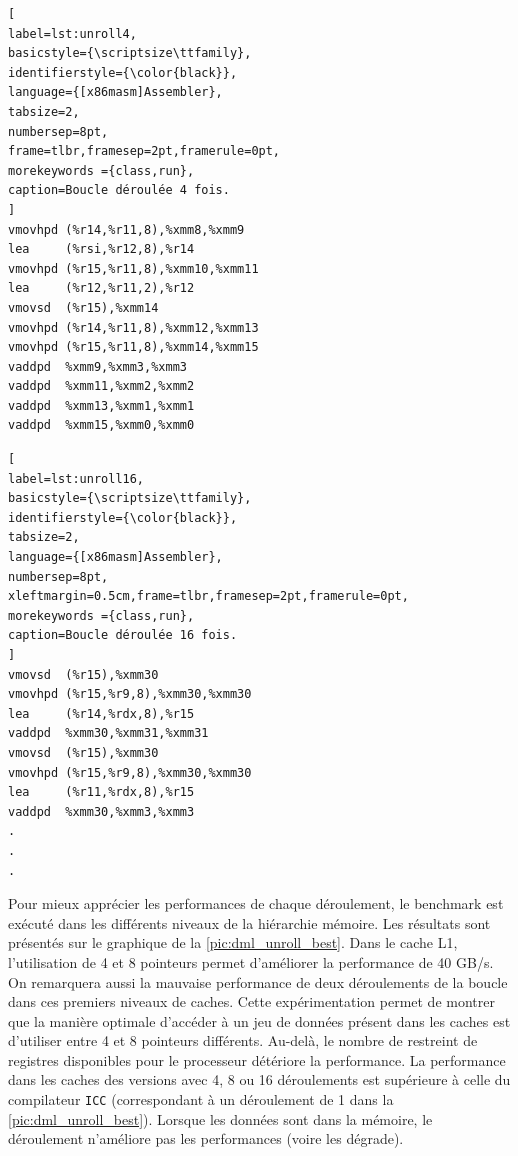 \begin{minipage}{.45\textwidth}
\begin{lstlisting}[
label=lst:unroll4,
basicstyle={\scriptsize\ttfamily},
identifierstyle={\color{black}},
language={[x86masm]Assembler},
tabsize=2,
numbersep=8pt,
frame=tlbr,framesep=2pt,framerule=0pt,
morekeywords ={class,run},
caption=Boucle déroulée 4 fois.
]
vmovhpd (%r14,%r11,8),%xmm8,%xmm9
lea     (%rsi,%r12,8),%r14
vmovhpd (%r15,%r11,8),%xmm10,%xmm11
lea     (%r12,%r11,2),%r12
vmovsd  (%r15),%xmm14
vmovhpd (%r14,%r11,8),%xmm12,%xmm13
vmovhpd (%r15,%r11,8),%xmm14,%xmm15
vaddpd  %xmm9,%xmm3,%xmm3
vaddpd  %xmm11,%xmm2,%xmm2
vaddpd  %xmm13,%xmm1,%xmm1
vaddpd  %xmm15,%xmm0,%xmm0
\end{lstlisting}
\end{minipage}%
\hfill
%
\begin{minipage}{.45\textwidth}
\begin{lstlisting}[
label=lst:unroll16,
basicstyle={\scriptsize\ttfamily},
identifierstyle={\color{black}},
tabsize=2,
language={[x86masm]Assembler},
numbersep=8pt,
xleftmargin=0.5cm,frame=tlbr,framesep=2pt,framerule=0pt,
morekeywords ={class,run},
caption=Boucle déroulée 16 fois.
]
vmovsd  (%r15),%xmm30
vmovhpd (%r15,%r9,8),%xmm30,%xmm30
lea     (%r14,%rdx,8),%r15
vaddpd  %xmm30,%xmm31,%xmm31
vmovsd  (%r15),%xmm30
vmovhpd (%r15,%r9,8),%xmm30,%xmm30
lea     (%r11,%rdx,8),%r15
vaddpd  %xmm30,%xmm3,%xmm3
. 
. 
. 
\end{lstlisting}
\end{minipage}
    
        
        Pour mieux apprécier les performances de chaque déroulement, le benchmark est exécuté dans les différents niveaux de la hiérarchie mémoire. Les résultats sont présentés sur le graphique de la \autoref{pic:dml_unroll_best}. Dans le cache L1, l'utilisation de 4 et 8 pointeurs permet d'améliorer la performance de 40 GB/s. On remarquera aussi la mauvaise performance de deux déroulements de la boucle dans ces premiers niveaux de caches. Cette expérimentation permet de montrer que la manière optimale d'accéder à un jeu de données présent dans les caches est d'utiliser entre 4 et 8 pointeurs différents. Au-delà, le nombre de restreint de registres disponibles pour le processeur détériore la performance. La performance dans les caches des versions avec 4, 8 ou 16 déroulements est supérieure à celle du compilateur \verb|ICC| (correspondant à un déroulement de 1 dans la \autoref{pic:dml_unroll_best}). Lorsque les données sont dans la mémoire, le déroulement n'améliore pas les performances (voire les dégrade). 
    
